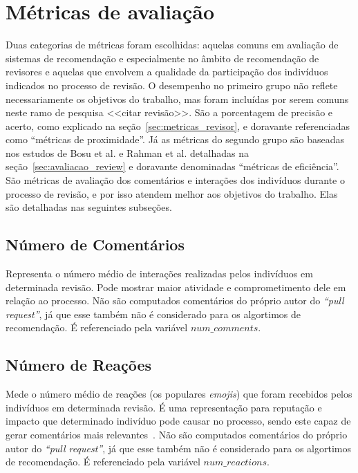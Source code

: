\documentclass[12pt,openany,oneside,a4paper,english,brazil]{abntbibufjf}
\begin{document}
    \section{Métricas de avaliação}

    Duas categorias de métricas foram escolhidas: aquelas comuns em avaliação de sistemas de recomendação e especialmente no âmbito de recomendação de revisores e aquelas que envolvem a qualidade da participação dos indivíduos indicados no processo de revisão. O desempenho no primeiro grupo não reflete necessariamente os objetivos do trabalho, mas foram incluídas por serem comuns neste ramo de pesquisa <<citar revisão>>. São a porcentagem de precisão e acerto, como explicado na seção~\ref{sec:metricas_revisor}, e doravante referenciadas como ``métricas de proximidade''. Já as métricas do segundo grupo são baseadas nos estudos de Bosu et al. \cite{bosu2015} e Rahman et al. \cite{rahman2017} detalhadas na seção~\ref{sec:avaliacao_review} e doravante denominadas ``métricas de eficiência''. São métricas de avaliação dos comentários e interações dos indivíduos durante o processo de revisão, e por isso atendem melhor aos objetivos do trabalho. Elas são detalhadas nas seguintes subseções.


    \subsection{Número de Comentários}
      Representa o número médio de interações realizadas pelos indivíduos em determinada revisão. Pode mostrar maior atividade e comprometimento dele em relação ao processo. Não são computados comentários do próprio autor do \textit{``pull request''}, já que esse também não é considerado para os algortimos de recomendação. É referenciado pela variável $num\_comments$.

    \subsection{Número de Reações}
      Mede o número médio de reações (os populares \textit{emojis}) que foram recebidos pelos indivíduos em determinada revisão. É uma representação para reputação e impacto que determinado indivíduo pode causar no processo, sendo este capaz de gerar comentários mais relevantes~\cite{bosu2015}. Não são computados comentários do próprio autor do \textit{``pull request''}, já que esse também não é considerado para os algortimos de recomendação. É referenciado pela variável $num\_reactions$.
\end{document}
